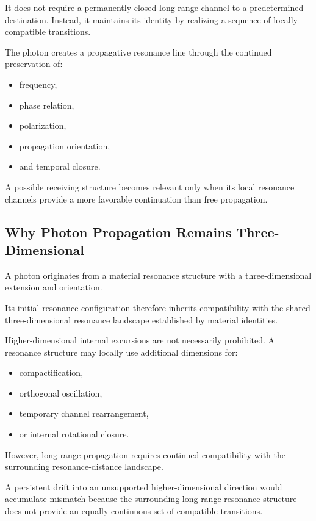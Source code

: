 \documentclass[11pt,a4paper]{article}
\begin{document}
It does not require a permanently closed long-range channel to a predetermined destination. Instead, it maintains its identity by realizing a sequence of locally compatible transitions.

The photon creates a propagative resonance line through the continued preservation of:

\begin{itemize}
    \item frequency,
    \item phase relation,
    \item polarization,
    \item propagation orientation,
    \item and temporal closure.
\end{itemize}

A possible receiving structure becomes relevant only when its local resonance channels provide a more favorable continuation than free propagation.



\subsection{Why Photon Propagation Remains Three-Dimensional}
\label{sec:photon_three_dimensional_propagation}

A photon originates from a material resonance structure with a three-dimensional extension and orientation.

Its initial resonance configuration therefore inherits compatibility with the shared three-dimensional resonance landscape established by material identities.

Higher-dimensional internal excursions are not necessarily prohibited. A resonance structure may locally use additional dimensions for:

\begin{itemize}
    \item compactification,
    \item orthogonal oscillation,
    \item temporary channel rearrangement,
    \item or internal rotational closure.
\end{itemize}

However, long-range propagation requires continued compatibility with the surrounding resonance-distance landscape.

A persistent drift into an unsupported higher-dimensional direction would accumulate mismatch because the surrounding long-range resonance structure does not provide an equally continuous set of compatible transitions.
\end{document}
